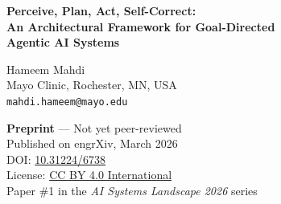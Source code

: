 \documentclass[12pt, a4paper]{article}
\begin{document}
\begin{center}
    {\Large\bfseries Perceive, Plan, Act, Self-Correct:\\[4pt]
    An Architectural Framework for Goal-Directed\\[2pt]
    Agentic AI Systems}

    \vspace{1em}

    {\large Hameem Mahdi~}\\[4pt]
    Mayo Clinic, Rochester, MN, USA\\
    \texttt{mahdi.hameem@mayo.edu}

    \vspace{1em}

    {\small\textbf{Preprint} — Not yet peer-reviewed}\\[2pt]
    {\small Published on engrXiv, March 2026}\\[2pt]
    {\small DOI: \href{https://doi.org/10.31224/6738}{10.31224/6738}}\\[2pt]
    {\small License: \href{https://creativecommons.org/licenses/by/4.0/}{CC BY 4.0 International}}\\[2pt]
    {\small Paper \#1 in the \emph{AI Systems Landscape 2026} series}
\end{center}

\vspace{1em}
\end{document}
